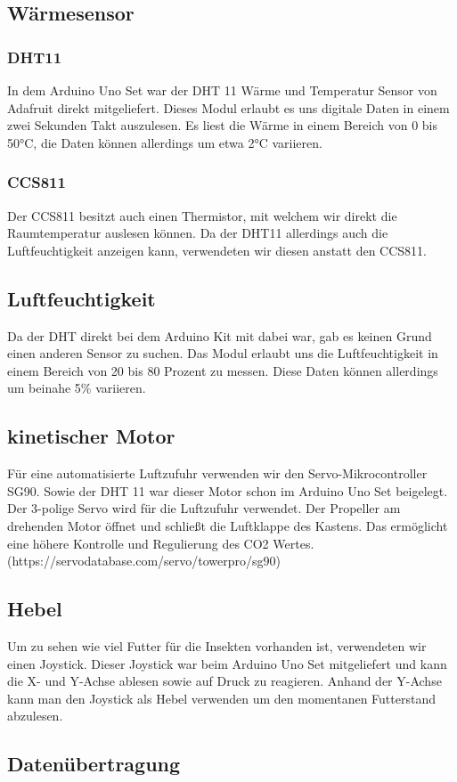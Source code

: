 \subsection{Wärmesensor}

\subsubsection{DHT11}

In dem Arduino Uno Set war der DHT 11 Wärme und Temperatur Sensor von Adafruit direkt mitgeliefert. Dieses Modul erlaubt es uns digitale Daten in einem zwei Sekunden Takt auszulesen. Es liest die Wärme in einem Bereich von 0 bis 50°C, die Daten können allerdings um etwa 2°C variieren.

\subsubsection{CCS811}

Der CCS811 besitzt auch einen Thermistor, mit welchem wir direkt die Raumtemperatur auslesen können. Da der DHT11 allerdings auch die Luftfeuchtigkeit anzeigen kann, verwendeten wir diesen anstatt den CCS811. 
\cite{CCS811man}

\subsection{Luftfeuchtigkeit}

Da der DHT direkt bei dem Arduino Kit mit dabei war, gab es keinen Grund einen anderen Sensor zu suchen. Das Modul erlaubt uns die Luftfeuchtigkeit in einem Bereich von 20 bis 80 Prozent zu messen. Diese Daten können allerdings um beinahe 5\% variieren.  

\subsection{kinetischer Motor}

Für eine automatisierte Luftzufuhr verwenden wir den Servo-Mikrocontroller SG90. Sowie der DHT 11 war dieser Motor schon im Arduino Uno Set beigelegt. Der 3-polige Servo wird für die Luftzufuhr verwendet. Der Propeller am drehenden Motor öffnet und schließt die Luftklappe des Kastens. Das ermöglicht eine höhere Kontrolle und Regulierung des CO2 Wertes. (https://servodatabase.com/servo/towerpro/sg90)

\subsection{Hebel}

Um zu sehen wie viel Futter für die Insekten vorhanden ist, verwendeten wir einen Joystick. Dieser Joystick war beim Arduino Uno Set mitgeliefert und kann die X- und Y-Achse ablesen sowie auf Druck zu reagieren. Anhand der Y-Achse kann man den Joystick als Hebel verwenden um den momentanen Futterstand abzulesen. 


\subsection{Datenübertragung}



